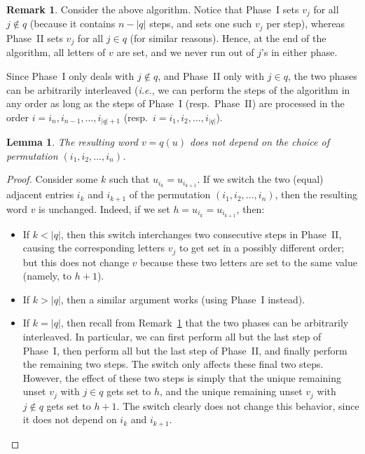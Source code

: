 \documentclass[reqno]{amsart}
\newcommand{\0}{\phantom{c}}
\newcommand{\abs}[1]{\left| #1 \right|}
\newcommand{\tup}[1]{\left( #1 \right)}
\theoremstyle{plain}
\newtheorem{lemma}[thm]{Lemma}
\theoremstyle{definition}
\newtheorem{remark}[thm]{Remark}
\numberwithin{equation}{section}
\begin{document}
\begin{remark}
\label{rmk:order-agnostic}
Consider the above algorithm.
Notice that Phase~I sets $v_j$ for all $j \notin q$ (because it contains
$n - \abs{q}$ steps, and sets one such $v_j$ per step),
whereas Phase~II sets $v_j$ for all $j \in q$ (for similar reasons).
Hence, at the end of the algorithm, all letters of $v$ are set, and we never
run out of $j$'s in either phase.

Since Phase~I only deals with $j \notin q$, and Phase~II only with $j\in q$,
the two phases can be arbitrarily interleaved
(\textit{i.e.}, we can perform the steps of the algorithm in any order as long as
the steps of Phase~I (resp.\ Phase~II) are processed in the order $i = i_n, i_{n-1}, \ldots, i_{\abs{q}+1}$
(resp.\ $i = i_1, i_2, \ldots, i_{\abs{q}}$).
\end{remark}

\begin{lemma}
\label{lemma:order_indep}
The resulting word $v = q(u)$ does not depend on the choice of permutation $(i_1, i_2, \dotsc, i_n)$.
\end{lemma}

\begin{proof}
Consider some $k$ such that $u_{i_k} = u_{i_{k+1}}$.
If we switch the two (equal) adjacent entries $i_k$ and $i_{k+1}$ of the
permutation $\tup{i_1, i_2, \ldots, i_n}$,
then the resulting word $v$ is unchanged.
Indeed, if we set $h = u_{i_k} = u_{i_{k+1}}$, then:
\begin{itemize}
 \item If $k < \abs{q}$, then this switch interchanges two consecutive
       steps in Phase~II, causing the corresponding letters $v_j$ to
       get set in a possibly different order; but this does not change $v$
       because these two letters are set to the same value
       (namely, to $h+1$).
 \item If $k > \abs{q}$, then a similar argument works (using Phase~I instead).
 \item If $k = \abs{q}$, then recall from Remark~\ref{rmk:order-agnostic} that
       the two phases can be arbitrarily interleaved.
       In particular, we can first perform all but the last step of Phase~I,
       then perform all but the last step of Phase~II,
       and finally perform the remaining two steps.
       The switch only affects these final two steps.
       However, the effect of these two steps is simply that the unique
       remaining unset $v_j$ with $j \in q$ gets set to $h$,
       and the unique remaining unset $v_j$ with $j \notin q$ gets set to $h+1$.
       The switch clearly does not change this behavior,
       since it does not depend on $i_k$ and $i_{k+1}$.
\end{itemize}
\end{proof}
\end{document}
